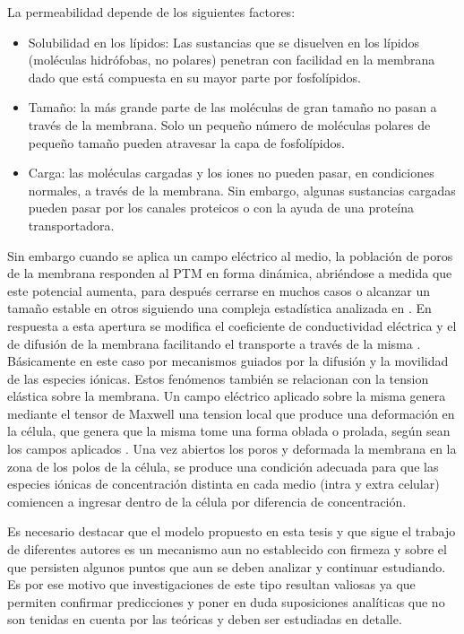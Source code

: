 La permeabilidad depende de los siguientes factores:
\begin{itemize}
    \item Solubilidad en los lípidos: Las sustancias que se disuelven en los lípidos (moléculas hidrófobas, no polares) penetran con facilidad en la membrana dado que está compuesta en su mayor parte por fosfolípidos.
    \item Tamaño: la más grande parte de las moléculas de gran tamaño no pasan a través de la membrana. Solo un pequeño número de moléculas polares de pequeño tamaño pueden atravesar la capa de fosfolípidos.
    \item Carga: las moléculas cargadas y los iones no pueden pasar, en condiciones normales, a través de la membrana. Sin embargo, algunas sustancias cargadas pueden pasar por los canales proteicos o con la ayuda de una proteína transportadora.
\end{itemize}
Sin embargo cuando se aplica un campo eléctrico al medio, la población de poros de la membrana responden al PTM en forma dinámica, abriéndose a medida que este potencial aumenta, para después cerrarse en muchos casos o alcanzar un tamaño estable en otros siguiendo una compleja estadística analizada en \cite{krass07}. En respuesta a esta apertura se modifica el coeficiente de conductividad eléctrica y el de difusión de la membrana facilitando el transporte a través de la misma \cite{c6-fodava}. Básicamente en este caso por mecanismos guiados por la difusión y la movilidad de las especies iónicas. Estos fenómenos también se relacionan con la tension elástica sobre la membrana. Un campo eléctrico aplicado sobre la misma genera mediante el tensor de Maxwell una tension local que produce una deformación en la célula, que genera que la misma tome una forma oblada o prolada, según sean los campos aplicados \cite{c13, c14}. Una vez abiertos los poros y deformada la membrana en la zona de los polos de la célula, se produce una condición adecuada para que las especies iónicas de concentración distinta en cada medio (intra y extra celular) comiencen a ingresar dentro de la célula por diferencia de concentración. 

Es necesario destacar que el modelo propuesto en esta tesis y que sigue el trabajo de diferentes autores \cite{krass07, c8}  es un mecanismo aun no establecido con firmeza y sobre el que persisten algunos puntos que aun se deben analizar y continuar estudiando. Es por ese motivo que investigaciones de este tipo resultan valiosas ya que permiten confirmar predicciones y poner en duda suposiciones analíticas que no son tenidas en cuenta por las teóricas y deben ser estudiadas en detalle. 

